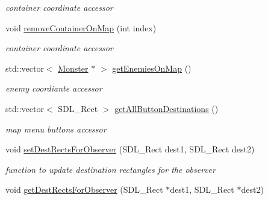 \begin{DoxyCompactItemize}
\begin{DoxyCompactList}\small\item\em container coordinate accessor \end{DoxyCompactList}\item 
\hypertarget{class_pre_built_level_ac4606a6b775f2804426be10ab0b803a6}{}\label{class_pre_built_level_ac4606a6b775f2804426be10ab0b803a6} 
void \hyperlink{class_pre_built_level_ac4606a6b775f2804426be10ab0b803a6}{remove\+Container\+On\+Map} (int index)
\begin{DoxyCompactList}\small\item\em container coordinate accessor \end{DoxyCompactList}\item 
\hypertarget{class_pre_built_level_ad8f55b7e0a86849db228582550917667}{}\label{class_pre_built_level_ad8f55b7e0a86849db228582550917667} 
std\+::vector$<$ \hyperlink{class_monster}{Monster} $\ast$ $>$ \hyperlink{class_pre_built_level_ad8f55b7e0a86849db228582550917667}{get\+Enemies\+On\+Map} ()
\begin{DoxyCompactList}\small\item\em enemy coordiante accessor \end{DoxyCompactList}\item 
\hypertarget{class_pre_built_level_ac03a041e9981a044dceb7aa0b2fa5639}{}\label{class_pre_built_level_ac03a041e9981a044dceb7aa0b2fa5639} 
std\+::vector$<$ S\+D\+L\+\_\+\+Rect $>$ \hyperlink{class_pre_built_level_ac03a041e9981a044dceb7aa0b2fa5639}{get\+All\+Button\+Destinations} ()
\begin{DoxyCompactList}\small\item\em map menu buttons accessor \end{DoxyCompactList}\item 
\hypertarget{class_pre_built_level_a9b04d07e4d36055d676d359f753ea6ae}{}\label{class_pre_built_level_a9b04d07e4d36055d676d359f753ea6ae} 
void \hyperlink{class_pre_built_level_a9b04d07e4d36055d676d359f753ea6ae}{set\+Dest\+Rects\+For\+Observer} (S\+D\+L\+\_\+\+Rect dest1, S\+D\+L\+\_\+\+Rect dest2)
\begin{DoxyCompactList}\small\item\em function to update destination rectangles for the observer \end{DoxyCompactList}\item 
\hypertarget{class_pre_built_level_ab96ad8d821e97b075c0bf616ef8eddd5}{}\label{class_pre_built_level_ab96ad8d821e97b075c0bf616ef8eddd5} 
void \hyperlink{class_pre_built_level_ab96ad8d821e97b075c0bf616ef8eddd5}{get\+Dest\+Rects\+For\+Observer} (S\+D\+L\+\_\+\+Rect $\ast$dest1, S\+D\+L\+\_\+\+Rect $\ast$dest2)

\end{DoxyCompactItemize}
